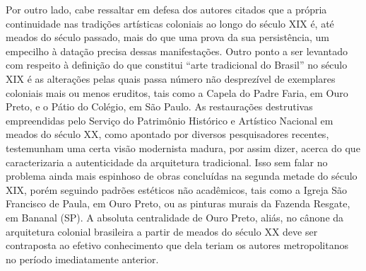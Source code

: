 Por outro lado, cabe ressaltar em defesa dos autores citados que a
própria continuidade nas tradições artísticas coloniais ao longo do
século XIX é, até meados do século passado, mais do que uma prova da sua
persistência, um empecilho à datação precisa dessas manifestações. Outro
ponto a ser levantado com respeito à definição do que constitui ``arte
tradicional do Brasil'' no século XIX é as alterações pelas quais passa
número não desprezível de exemplares coloniais mais ou menos eruditos,
tais como a Capela do Padre Faria, em Ouro Preto, e o Pátio do Colégio,
em São Paulo. As restaurações destrutivas empreendidas pelo Serviço do
Patrimônio Histórico e Artístico Nacional em meados do século XX, como
apontado por diversos pesquisadores recentes, testemunham uma certa
visão modernista madura, por assim dizer, acerca do que caracterizaria a
autenticidade da arquitetura tradicional. Isso sem falar no problema
ainda mais espinhoso de obras concluídas na segunda metade do século
XIX, porém seguindo padrões estéticos não acadêmicos, tais como a Igreja
São Francisco de Paula, em Ouro Preto, ou as pinturas murais da Fazenda
Resgate, em Bananal (SP). A absoluta centralidade de Ouro Preto, aliás,
no cânone da arquitetura colonial brasileira a partir de meados do
século XX deve ser contraposta ao efetivo conhecimento que dela teriam
os autores metropolitanos no período imediatamente anterior.
